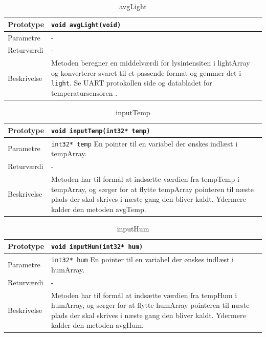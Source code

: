 
\begin{table}[h]
\begin{tabularx}{\textwidth}{| >{\raggedright\arraybackslash}p{2.5 cm} | >{\raggedright\arraybackslash}X |} \hline
Prototype & \texttt{void avgLight(void)} \\\hline
Parametre & - \\\hline
Returværdi & - \\\hline
Beskrivelse & Metoden beregner en middelværdi for lysintensiten i lightArray og konverterer svaret til et passende format og gemmer det i \texttt{light}. Se UART protokollen side \pageref{UART_Protokol} og databladet for temperatursensoren \cite{lib:LightSens}.  \\ \hline
\end{tabularx}
\caption{avgLight}
\label{table:avgLight}
\end{table}


\begin{table}[h]
\begin{tabularx}{\textwidth}{| >{\raggedright\arraybackslash}p{2.5 cm} | >{\raggedright\arraybackslash}X |} \hline
Prototype & \texttt{void inputTemp(int32* temp)} \\\hline
Parametre & \texttt{int32* temp} \newline
En pointer til en variabel der ønskes indlæst i tempArray. \\\hline
Returværdi & - \\\hline
Beskrivelse & Metoden har til formål at indsætte værdien fra tempTemp i tempArray, og sørger for at flytte tempArray pointeren til næste plads der skal skrives i næste gang den bliver kaldt. Ydermere kalder den metoden avgTemp.  \\\hline
\end{tabularx}
\caption{inputTemp}
\label{table:inputTemp}
\end{table}


\begin{table}[h]
\begin{tabularx}{\textwidth}{| >{\raggedright\arraybackslash}p{2.5 cm} | >{\raggedright\arraybackslash}X |} \hline
Prototype & \texttt{void inputHum(int32* hum)} \\\hline
Parametre & \texttt{int32* hum} \newline
En pointer til en variabel der ønskes indlæst i humArray. \\\hline
Returværdi & - \\\hline
Beskrivelse & Metoden har til formål at indsætte værdien fra tempHum i humArray, og sørger for at flytte humArray pointeren til næste plads der skal skrives i næste gang den bliver kaldt. Ydermere kalder den metoden avgHum.  \\\hline
\end{tabularx}
\caption{inputHum}
\label{table:inputHum}
\end{table}

